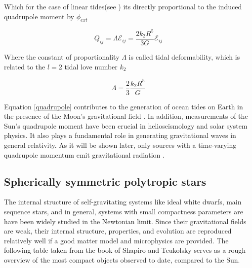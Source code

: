 Which for the case of linear tides(see \cite{poisson_will_2014, Hinderer:2007mb}) its directly proportional to the induced quadrupole moment by $\phi_{ext}$

\begin{equation}
Q_{ij} = \Lambda \mathcal{E}_{ij} = \frac{2k_2 R^5}{3G} \mathcal{E}_{ij}
\end{equation}

Where the constant of proportionality $\Lambda$ is called tidal deformability, which is related to the $l=2$ tidal love number $k_2$

\begin{equation}\label{Tid}
\Lambda = \frac{2}{3}\frac{k_2 R^5}{G}
\end{equation}

Equation \ref{quadrupole} contributes to the generation of ocean tides on Earth in the presence of the Moon's gravitational field \cite{Hartle:2021pel}. In addition, measurements of the Sun's quadrupole moment have been crucial in helioseismology and solar system physics. It also plays a fundamental role in generating gravitational waves in general relativity. As it will be shown later, only sources with a time-varying quadrupole momentum emit gravitational radiation \cite{Creighton:2011zz}.

\subsection{Spherically symmetric polytropic stars}

The internal structure of self-gravitating systems like ideal white dwarfs, main sequence stars, and in general, systems with small compactness parameters are have been widely studied in the Newtonian limit. Since their gravitational fields are weak, their internal structure, properties, and evolution are reproduced relatively well if a good matter model and microphysics are provided. The following table taken from the book of Shapiro and Teukolsky \cite{Shapiro:1983du} serves as a rough overview of the most compact objects observed to date, compared to the Sun.
\vspace{1cm}

